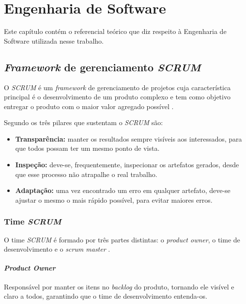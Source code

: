 \clearpage
\chapter{Engenharia de Software}

Este capítulo contém o referencial teórico que diz respeito à Engenharia de Software utilizada nesse trabalho.

\section{\textit{Framework} de gerenciamento \textit{SCRUM}}

O \textit{SCRUM} é um \textit{framework} de gerenciamento de projetos cuja característica principal é o desenvolvimento de um produto complexo e tem como objetivo entregar o produto com o maior valor agregado possível \cite{sutherland1995}.

Segundo  os três pilares que sustentam o \textit{SCRUM} são:

\begin{itemize}
    \item \textbf{Transparência:} manter os resultados sempre visíveis aos interessados, para que todos possam ter um mesmo ponto de vista.
    \item \textbf{Inspeção:} deve-se, frequentemente, inspecionar os artefatos gerados, desde que esse processo não atrapalhe o real trabalho.
    \item \textbf{Adaptação:} uma vez encontrado um erro em qualquer artefato, deve-se ajustar o mesmo o mais rápido possível, para evitar maiores erros.
\end{itemize}

\subsection{Time \textit{SCRUM}}

O time \textit{SCRUM} é formado por três partes distintas: o \textit{product owner}, o time de desenvolvimento e o \textit{scrum master} \cite{sutherland2013}.

\subsubsection{\textit{Product Owner}}
Responsável por manter os itens no \textit{backlog} do produto, tornando ele visível e claro a todos, garantindo que o time de desenvolvimento entenda-os.

